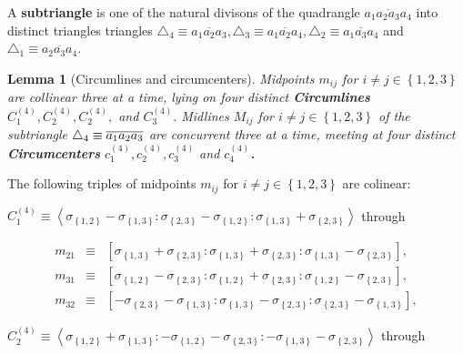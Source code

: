 \documentclass[11pt]{article}
\newtheorem{theorem}{Theorem}
\newtheorem{theorem}{Lemma}
\begin{document}
A \textbf{subtriangle} is one of the natural divisons of the quadrangle $%
\overline{a_{1}a_{2}a_{3}a_{4}}$ into distinct triangles triangles $%
\triangle _{4}\equiv \overline{a_{1}a_{2}a_{3}},\triangle _{3}\equiv 
\overline{a_{1}a_{2}a_{4}},\triangle _{2}\equiv \overline{a_{1}a_{3}a_{4}}$
and $\triangle _{1}\equiv \overline{a_{2}a_{3}a_{4}}$.

\begin{theorem}[Circumlines and circumcenters]
Midpoints $m_{ij}$ for $i\neq j\in \left\{ 1,2,3\right\} $ are collinear
three at a time, lying on four distinct \textbf{Circumlines} $C_{1}^{\left(
4\right) },C_{2}^{\left( 4\right) },C_{2}^{\left( 4\right) },$ and $%
C_{3}^{\left( 4\right) }.$ Midlines $M_{ij}$ for $i\neq j\in \left\{
1,2,3\right\} $ of the subtriangle $\triangle _{4}\equiv \overline{%
a_{1}a_{2}a_{3}}$ are concurrent three at a time, meeting at four distinct 
\textbf{Circumcenters} $c_{1}^{\left( 4\right) },c_{2}^{\left( 4\right)
},c_{3}^{\left( 4\right) }$ and $c_{4}^{\left( 4\right) }$\textbf{.}
\end{theorem}

The following triples of midpoints $m_{ij}$ for $i\neq j\in \left\{
1,2,3\right\} $ are colinear:

$C_{1}^{\left( 4\right) }\equiv \left\langle \sigma _{\left\{ 1,2\right\}
}-\sigma _{\left\{ 1,3\right\} }:\sigma _{\left\{ 2,3\right\} }-\sigma
_{\left\{ 1,2\right\} }:\sigma _{\left\{ 1,3\right\} }+\sigma _{\left\{
2,3\right\} }\right\rangle $ through

\begin{eqnarray*}
m_{21} &\equiv &\left[ \sigma _{\left\{ 1,3\right\} }+\sigma _{\left\{
2,3\right\} }:\sigma _{\left\{ 1,3\right\} }+\sigma _{\left\{ 2,3\right\}
}:\sigma _{\left\{ 1,3\right\} }-\sigma _{\left\{ 2,3\right\} }\right] , \\
m_{31} &\equiv &\left[ \sigma _{\left\{ 1,2\right\} }-\sigma _{\left\{
2,3\right\} }:\sigma _{\left\{ 1,2\right\} }+\sigma _{\left\{ 2,3\right\}
}:\sigma _{\left\{ 1,2\right\} }-\sigma _{\left\{ 2,3\right\} }\right] , \\
m_{32} &\equiv &\left[ -\sigma _{\left\{ 2,3\right\} }-\sigma _{\left\{
1,3\right\} }:\sigma _{\left\{ 1,3\right\} }-\sigma _{\left\{ 2,3\right\}
}:\sigma _{\left\{ 2,3\right\} }-\sigma _{\left\{ 1,3\right\} }\right] ,
\end{eqnarray*}

$C_{2}^{\left( 4\right) }\equiv \left\langle \sigma _{\left\{ 1,2\right\}
}+\sigma _{\left\{ 1,3\right\} }:-\sigma _{\left\{ 1,2\right\} }-\sigma
_{\left\{ 2,3\right\} }:-\sigma _{\left\{ 1,3\right\} }-\sigma _{\left\{
2,3\right\} }\right\rangle $ through
\end{document}
